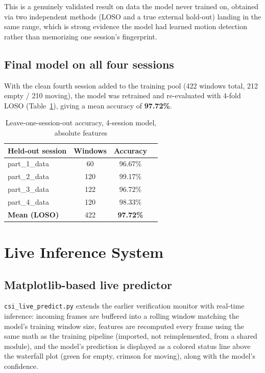 \documentclass[11pt,a4paper]{article}
\begin{document}
This is a genuinely validated result on data the model never trained
on, obtained via two independent methods (LOSO and a true external
hold-out) landing in the same range, which is strong evidence the model
had learned motion detection rather than memorizing one session's
fingerprint.

\subsection{Final model on all four sessions}

With the clean fourth session added to the training pool (422 windows
total, 212 empty / 210 moving), the model was retrained and re-evaluated
with 4-fold LOSO (Table~\ref{tab:loso4}), giving a mean accuracy of
\textbf{97.72\%}.

\begin{table}[h]
\centering
\begin{tabular}{lccc}
\toprule
\textbf{Held-out session} & \textbf{Windows} & \textbf{Accuracy} \\
\midrule
part\_1\_data & 60  & 96.67\% \\
part\_2\_data & 120 & 99.17\% \\
part\_3\_data & 122 & 96.72\% \\
part\_4\_data & 120 & 98.33\% \\
\midrule
\textbf{Mean (LOSO)} & 422 & \textbf{97.72\%} \\
\bottomrule
\end{tabular}
\caption{Leave-one-session-out accuracy, 4-session model, absolute features}
\label{tab:loso4}
\end{table}

\section{Live Inference System}

\subsection{Matplotlib-based live predictor}

\texttt{csi\_live\_predict.py} extends the earlier verification monitor
with real-time inference: incoming frames are buffered into a rolling
window matching the model's training window size, features are
recomputed every frame using the same math as the training pipeline
(imported, not reimplemented, from a shared module), and the model's
prediction is displayed as a colored status line above the waterfall
plot (green for empty, crimson for moving), along with the model's
confidence.
\end{document}
